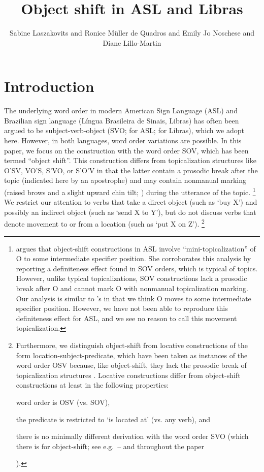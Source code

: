 \documentclass[output=paper,colorlinks,citecolor=brown,
]{langscibook}
\author{
    Sabine Laszakovits\affiliation{University of Connecticut; Austrian Academy of Sciences} and
    Ronice Müller de Quadros\affiliation{Universidade Federal de Santa Catarina} and 
    {Emily Jo} Noschese\affiliation{University of Hawai'i} and 
    Diane Lillo-Martin\affiliation{University of Connecticut; Haskins Laboratories}
}
\title{Object shift in ASL and Libras}
\begin{document}
\maketitle

\section{Introduction}

The underlying word order in modern American Sign Language (ASL)
and Brazilian sign language (Língua Brasileira de Sinais, Libras) has
often been argued to be subject-verb-object (SVO; 
\citealp[see]{Fischer.1975,Liddell.1980,Padden.1988} for ASL; 
\citealp{Quadros.1999,Quadros.2003} for Libras), 
which we adopt here. However, in both languages, word order
variations are possible. In this paper, we focus on the construction with
the word order SOV, which has been termed ``object shift''. This
construction differs from topicalization structures like O'SV, VO'S,
S'VO, or S'O'V in that the latter contain a prosodic break after the
topic (indicated here by an apostrophe) and may contain nonmanual
marking (raised brows and a slight upward chin tilt; 
\citealp{Liddell.1977,Liddell.1980,Padden.1988}) during the utterance of the topic.%
\footnote{
    \citet{Fischer.1990} argues that object-shift constructions in ASL involve
    ``mini-topicalization'' of O to some intermediate specifier position. She corroborates
    this analysis by reporting a definiteness effect found in SOV orders, which is typical
    of topics. However, unlike typical topicalizations, SOV constructions lack a prosodic
    break after O and cannot mark O with nonmanual topicalization marking. Our
    analysis is similar to \citeauthor{Fischer.1990}'s in that we think O moves to some intermediate
    specifier position. However, we have not been able to reproduce this definiteness
    effect for ASL, and we see no reason to call this movement topicalization.
}
We restrict our attention to verbs that take a direct object (such as `buy X') and
possibly an indirect object (such as `send X to Y'), but do not discuss
verbs that denote movement to or from a location (such as `put X on Z').%
\footnote{
    Furthermore, we distinguish object-shift from locative constructions of the
    form location-subject-predicate, which have been taken as instances of the word
    order OSV because, like object-shift, they lack the prosodic break of topicalization
    structures \citep{Liddell.1980}. Locative constructions differ from object-shift
    constructions at least in the following properties: 
    \begin{inparaenum}[(i)]
        \item word order is OSV (vs. SOV),
        \item the predicate is restricted to `is located at' (vs. any verb), and 
        \item there is no minimally different derivation with the word order SVO (which there is for
    object-shift; see e.g.~-- and throughout the paper
    \end{inparaenum}).
}
\end{document}

